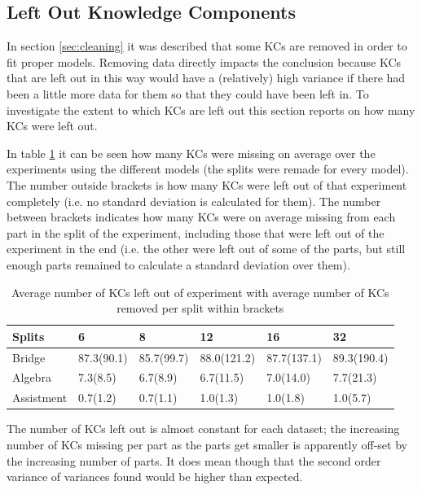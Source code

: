 \documentclass{scrartcl}
\begin{document}
\subsection{Left Out Knowledge Components}
In section \ref{sec:cleaning} it was described that some KCs are removed in order to fit proper models. Removing data directly impacts the conclusion because KCs that are left out in this way would have a (relatively) high variance if there had been a little more data for them so that they could have been left in. To investigate the extent to which KCs are left out this section reports on how many KCs were left out.   

In table \ref{tab:kcmis} it can be seen how many KCs were missing on average over the experiments using the different models (the splits were remade for every model). The number outside brackets is how many KCs were left out of that experiment completely (i.e. no standard deviation is calculated for them). The number between brackets indicates how many KCs were on average missing from each part in the split of the experiment, including those that were left out of the experiment in the end (i.e. the other were left out of some of the parts, but still enough parts remained to calculate a standard deviation over them). 

\begin{center}
\begin{table}[!htbp]
\begin{tabular}{| l | l|l|l|l|l|}

    \hline
    Splits & 6  & 8 & 12 & 16 & 32 \\ \hline
    Bridge &  87.3(90.1)& 85.7(99.7)& 88.0(121.2)& 87.7(137.1)& 89.3(190.4) \\ \hline
    Algebra & 7.3(8.5)& 6.7(8.9)& 6.7(11.5)& 7.0(14.0)& 7.7(21.3) \\ \hline
    Assistment & 0.7(1.2)& 0.7(1.1)& 1.0(1.3)& 1.0(1.8)& 1.0(5.7) \\ \hline

\end{tabular}
\caption{Average number of KCs left out of experiment with average number of KCs removed per split within brackets}
\label{tab:kcmis}
\end{table}
\end{center}

The number of KCs left out is almost constant for each dataset; the increasing number of KCs missing per part as the parts get smaller is apparently off-set by the increasing number of parts. It does mean though that the second order variance of variances found would be higher than expected.
\end{document}
